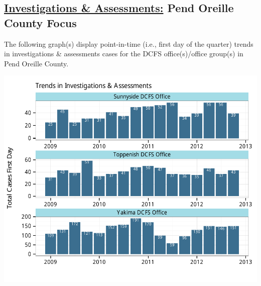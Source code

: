 \documentclass{article}\usepackage[]{graphicx}\usepackage[]{color}
\makeatletter
\def\maxwidth{ %
  \ifdim\Gin@nat@width>\linewidth
    \linewidth
  \else
    \Gin@nat@width
  \fi
}
\newenvironment{knitrout}{}{} %
\makeatother
\begin{document}
\begin{minipage}{\textwidth}
\subsection{\href{http://www.partnersforourchildren.org//child-well-being/visualizations/investigations-assessments/trends}
{Investigations \& Assessments:} Pend Oreille County Focus}
The following graph(s) display point-in-time (i.e., first day of the quarter) trends in investigations \& assessments cases for the DCFS office(s)/office group(s) in Pend Oreille County.  
\begin{knitrout}
\color{fgcolor}

{\centering \includegraphics[width=\maxwidth]{figure/ia_focus} 

}



\end{knitrout}

\end{minipage}

\newpage
\end{document}

